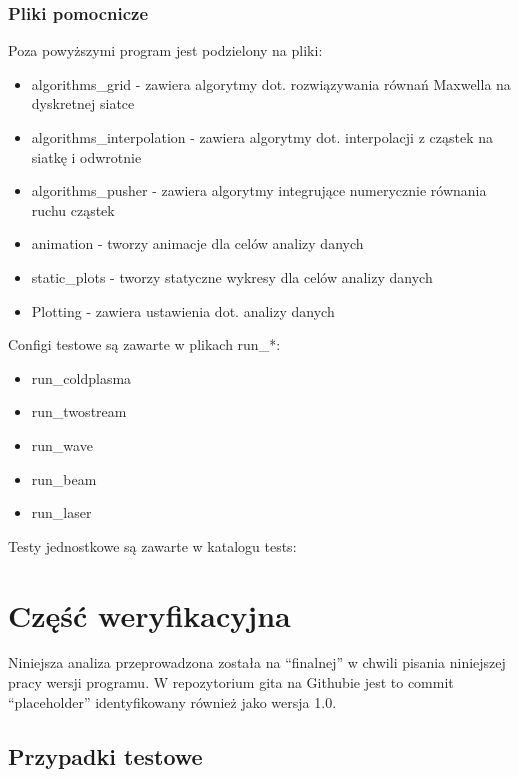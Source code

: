     \subsubsection{Pliki pomocnicze}
    Poza powyższymi program jest podzielony na pliki:
    \begin{itemize}
        \item algorithms\_grid - zawiera algorytmy dot. rozwiązywania równań Maxwella na dyskretnej siatce
        \item algorithms\_interpolation - zawiera algorytmy dot. interpolacji z cząstek na siatkę i odwrotnie
        \item algorithms\_pusher - zawiera algorytmy integrujące numerycznie równania ruchu cząstek
        \item animation - tworzy animacje dla celów analizy danych
        \item static\_plots - tworzy statyczne wykresy dla celów analizy danych
        \item Plotting - zawiera ustawienia dot. analizy danych 
    \end{itemize}

    Configi testowe są zawarte w plikach run\_*: 
    \begin{itemize}
        \item run\_coldplasma
        \item run\_twostream
        \item run\_wave
        \item run\_beam
        \item run\_laser
    \end{itemize}

    Testy jednostkowe są zawarte w katalogu tests:



    \section[Weryfikacja]{Część weryfikacyjna} %
    Niniejsza analiza przeprowadzona została na ``finalnej'' w chwili pisania niniejszej pracy wersji programu.
    W repozytorium gita na Githubie jest to commit ``placeholder'' 
    identyfikowany również jako wersja 1.0.

    \subsection{Przypadki testowe}

